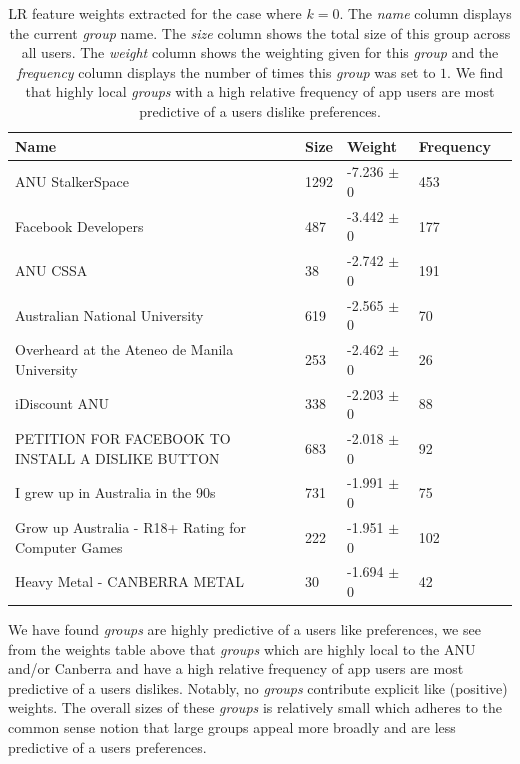 \begin{table}[h]
\begin{minipage}[b]{1.0\textwidth}
\centering
  \begin{tabular}{|l|l|l|l|l|} %
  \hline
  \textbf{Name} & \textbf{Size} & \textbf{Weight} & \textbf{Frequency} \\ \hline
\small{ANU StalkerSpace} & 1292 & -7.236 $\pm$ 0 & 453 \\ \hline
\small{Facebook Developers} & 487 & -3.442 $\pm$ 0 & 177 \\ \hline
\small{ANU CSSA} & 38 & -2.742 $\pm$ 0 & 191 \\ \hline
\small{Australian National University} & 619 & -2.565 $\pm$ 0 & 70 \\ \hline
\small{Overheard at the Ateneo de Manila University} & 253 & -2.462 $\pm$ 0 & 26 \\ \hline
\small{iDiscount ANU} & 338 & -2.203 $\pm$ 0 & 88 \\ \hline
\small{PETITION FOR FACEBOOK TO INSTALL A DISLIKE BUTTON} & 683 & -2.018 $\pm$ 0 & 92 \\ \hline
\small{I grew up in Australia in the 90s} & 731 & -1.991 $\pm$ 0 & 75 \\ \hline
\small{Grow up Australia - R18+ Rating for Computer Games} & 222 & -1.951 $\pm$ 0 & 102 \\ \hline
\small{Heavy Metal - CANBERRA METAL} & 30 & -1.694 $\pm$ 0 & 42 \\ \hline
  \end{tabular}
  \caption{LR feature weights extracted for the case where $k=0$. The \emph{name} column displays the current \emph{group} name.
  The \emph{size} column shows the total size of this group across all users.
  The \emph{weight} column shows the weighting given for this \emph{group} and the \emph{frequency} column displays the number of times 
  this \emph{group} was set to $1$. We find that highly local \emph{groups} with a high relative frequency of app users are most predictive of a users dislike preferences.}
\end{minipage}
\end{table}

We have found \emph{groups} are highly predictive of a users like preferences, we see from the weights table above that \emph{groups} which are highly local to 
the ANU and/or Canberra and have a high relative frequency of app users are most predictive of a users dislikes. Notably, no \emph{groups} contribute 
explicit like (positive) weights. The 
overall sizes of these \emph{groups} is relatively small which adheres to the common sense notion that large groups appeal more 
broadly and are less predictive of a users preferences.

